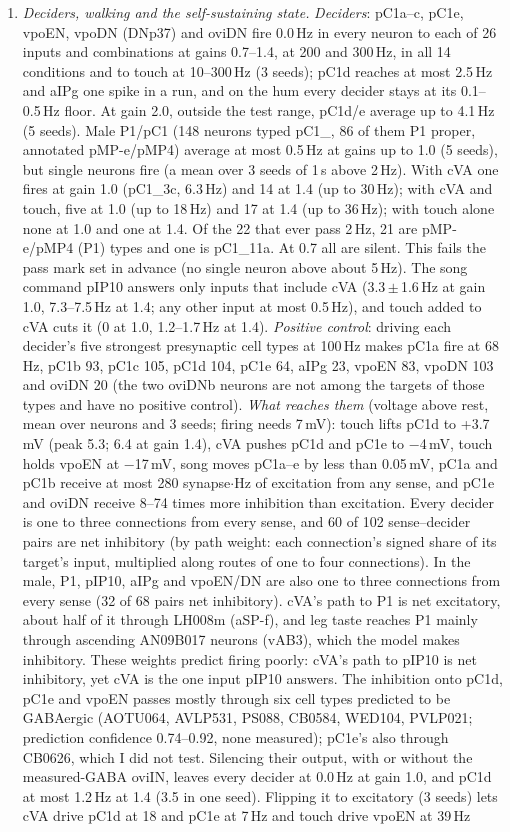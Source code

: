\begin{enumerate}[leftmargin=*, label=\arabic*., itemsep=4pt]
\item \emph{Deciders, walking and the self-sustaining state.} \emph{Deciders}: pC1a--c, pC1e, vpoEN, vpoDN (DNp37) and oviDN fire 0.0\,Hz in every neuron to each of 26 inputs and combinations at gains 0.7--1.4, at 200 and 300\,Hz, in all 14 conditions and to touch at 10--300\,Hz (3 seeds); pC1d reaches at most 2.5\,Hz and aIPg one spike in a run, and on the hum every decider stays at its 0.1--0.5\,Hz floor. At gain 2.0, outside the test range, pC1d/e average up to 4.1\,Hz (5 seeds). Male P1/pC1 (148 neurons typed pC1\_, 86 of them P1 proper, annotated pMP-e/pMP4) average at most 0.5\,Hz at gains up to 1.0 (5 seeds), but single neurons fire (a mean over 3 seeds of 1\,s above 2\,Hz). With cVA one fires at gain 1.0 (pC1\_3c, 6.3\,Hz) and 14 at 1.4 (up to 30\,Hz); with cVA and touch, five at 1.0 (up to 18\,Hz) and 17 at 1.4 (up to 36\,Hz); with touch alone none at 1.0 and one at 1.4. Of the 22 that ever pass 2\,Hz, 21 are pMP-e/pMP4 (P1) types and one is pC1\_11a. At 0.7 all are silent. This fails the pass mark set in advance (no single neuron above about 5\,Hz). The song command pIP10 answers only inputs that include cVA (3.3\,$\pm$\,1.6\,Hz at gain 1.0, 7.3--7.5\,Hz at 1.4; any other input at most 0.5\,Hz), and touch added to cVA cuts it (0 at 1.0, 1.2--1.7\,Hz at 1.4). \emph{Positive control}: driving each decider's five strongest presynaptic cell types at 100\,Hz makes pC1a fire at 68\,Hz, pC1b 93, pC1c 105, pC1d 104, pC1e 64, aIPg 23, vpoEN 83, vpoDN 103 and oviDN 20 (the two oviDNb neurons are not among the targets of those types and have no positive control). \emph{What reaches them} (voltage above rest, mean over neurons and 3 seeds; firing needs 7\,mV): touch lifts pC1d to +3.7\,mV (peak 5.3; 6.4 at gain 1.4), cVA pushes pC1d and pC1e to $-$4\,mV, touch holds vpoEN at $-$17\,mV, song moves pC1a--e by less than 0.05\,mV, pC1a and pC1b receive at most 280 synapse$\cdot$Hz of excitation from any sense, and pC1e and oviDN receive 8--74 times more inhibition than excitation. Every decider is one to three connections from every sense, and 60 of 102 sense--decider pairs are net inhibitory (by path weight: each connection's signed share of its target's input, multiplied along routes of one to four connections). In the male, P1, pIP10, aIPg and vpoEN/DN are also one to three connections from every sense (32 of 68 pairs net inhibitory). cVA's path to P1 is net excitatory, about half of it through LH008m (aSP-f), and leg taste reaches P1 mainly through ascending AN09B017 neurons (vAB3), which the model makes inhibitory. These weights predict firing poorly: cVA's path to pIP10 is net inhibitory, yet cVA is the one input pIP10 answers. The inhibition onto pC1d, pC1e and vpoEN passes mostly through six cell types predicted to be GABAergic (AOTU064, AVLP531, PS088, CB0584, WED104, PVLP021; prediction confidence 0.74--0.92, none measured); pC1e's also through CB0626, which I did not test. Silencing their output, with or without the measured-GABA oviIN, leaves every decider at 0.0\,Hz at gain 1.0, and pC1d at most 1.2\,Hz at 1.4 (3.5 in one seed). Flipping it to excitatory (3 seeds) lets cVA drive pC1d at 18 and pC1e at 7\,Hz and touch drive vpoEN at 39\,Hz 
\end{enumerate}
